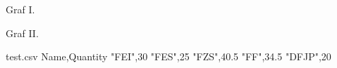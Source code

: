 \documentclass{beamer}							%
\begin{document}
\begin{frame}{Graf I.}
\begin{center}

\end{center}
\end{frame}
\begin{frame}[fragile]{Graf II.}

\begin{filecontents}{test.csv}
Name,Quantity
"FEI",30
"FES",25
"FZS",40.5
"FF",34.5
"DFJP",20
\end{filecontents}


\begin{figure}[htbp]
\centering
{}
\end{figure}
\end{frame}
\end{document}
